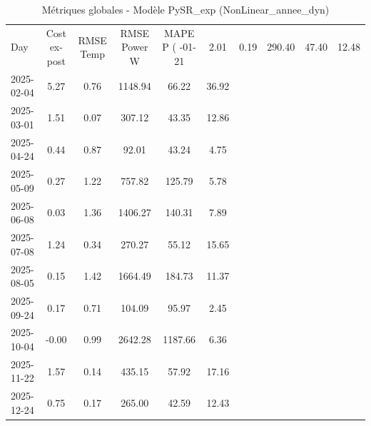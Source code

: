 \begin{table}
\caption{Métriques globales - Modèle PySR_exp (NonLinear_annee_dyn)}
\label{tab:PySR_exp_NonLinear_annee_dyn_Validation_EPlus_sans_Opti}
\begin{small}
\begin{tabular}{lccccc}
\toprule
Day & Cost ex-post & RMSE Temp & RMSE Power W & MAPE P (%
-01-21 & 2.01 & 0.19 & 290.40 & 47.40 & 12.48 \\
2025-02-04 & 5.27 & 0.76 & 1148.94 & 66.22 & 36.92 \\
2025-03-01 & 1.51 & 0.07 & 307.12 & 43.35 & 12.86 \\
2025-04-24 & 0.44 & 0.87 & 92.01 & 43.24 & 4.75 \\
2025-05-09 & 0.27 & 1.22 & 757.82 & 125.79 & 5.78 \\
2025-06-08 & 0.03 & 1.36 & 1406.27 & 140.31 & 7.89 \\
2025-07-08 & 1.24 & 0.34 & 270.27 & 55.12 & 15.65 \\
2025-08-05 & 0.15 & 1.42 & 1664.49 & 184.73 & 11.37 \\
2025-09-24 & 0.17 & 0.71 & 104.09 & 95.97 & 2.45 \\
2025-10-04 & -0.00 & 0.99 & 2642.28 & 1187.66 & 6.36 \\
2025-11-22 & 1.57 & 0.14 & 435.15 & 57.92 & 17.16 \\
2025-12-24 & 0.75 & 0.17 & 265.00 & 42.59 & 12.43 \\
\bottomrule
\end{tabular}
\end{small}
\end{table}

